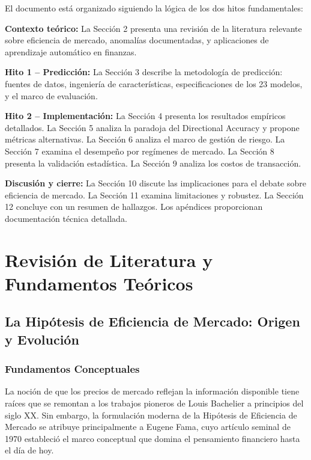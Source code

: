 \documentclass[11pt,a4paper]{article}
\begin{document}
El documento est\'a organizado siguiendo la l\'ogica de los dos hitos fundamentales:

\textbf{Contexto te\'orico:} La Secci\'on 2 presenta una revisi\'on de la literatura relevante sobre eficiencia de mercado, anomal\'ias documentadas, y aplicaciones de aprendizaje autom\'atico en finanzas.

\textbf{Hito 1 -- Predicci\'on:} La Secci\'on 3 describe la metodolog\'ia de predicci\'on: fuentes de datos, ingenier\'ia de caracter\'isticas, especificaciones de los 23 modelos, y el marco de evaluaci\'on.

\textbf{Hito 2 -- Implementaci\'on:} La Secci\'on 4 presenta los resultados emp\'iricos detallados. La Secci\'on 5 analiza la paradoja del Directional Accuracy y propone m\'etricas alternativas. La Secci\'on 6 analiza el marco de gesti\'on de riesgo. La Secci\'on 7 examina el desempe\~no por reg\'imenes de mercado. La Secci\'on 8 presenta la validaci\'on estad\'istica. La Secci\'on 9 analiza los costos de transacci\'on.

\textbf{Discusi\'on y cierre:} La Secci\'on 10 discute las implicaciones para el debate sobre eficiencia de mercado. La Secci\'on 11 examina limitaciones y robustez. La Secci\'on 12 concluye con un resumen de hallazgos. Los ap\'endices proporcionan documentaci\'on t\'ecnica detallada.

\section{Revisi\'on de Literatura y Fundamentos Te\'oricos}

\subsection{La Hip\'otesis de Eficiencia de Mercado: Origen y Evoluci\'on}

\subsubsection{Fundamentos Conceptuales}

La noci\'on de que los precios de mercado reflejan la informaci\'on disponible tiene ra\'ices que se remontan a los trabajos pioneros de Louis Bachelier a principios del siglo XX. Sin embargo, la formulaci\'on moderna de la Hip\'otesis de Eficiencia de Mercado se atribuye principalmente a Eugene Fama, cuyo art\'iculo seminal de 1970 estableci\'o el marco conceptual que domina el pensamiento financiero hasta el d\'ia de hoy.
\end{document}
